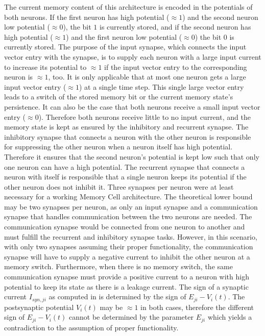 \documentclass[draft,final]{vutinfth} %
\begin{document}
    The current memory content of this architecture is encoded in the potentials of both neurons.
    If the first neuron has high potential ($\approx 1$) and the second neuron low potential ($\approx 0$), the bit $1$ is currently stored, and if the second neuron has high potential ($\approx 1$) and the first neuron low potential ($\approx 0$) the bit $0$ is currently stored.
    The purpose of the input synapse, which connects the input vector entry with the synapse, is to supply each neuron with a large input current to increase its potential to $\approx 1$ if the input vector entry to the corresponding neuron is $\approx 1$, too.
    It is only applicable that at most one neuron gets a large input vector entry ($\approx 1$) at a single time step.
    This single large vector entry leads to a switch of the stored memory bit or the current memory state's persistence.
    It can also be the case that both neurons receive a small input vector entry ($\approx 0$). Therefore both neurons receive little to no input current, and the memory state is kept as ensured by the inhibitory and recurrent synapse.
    The inhibitory synapse that connects a neuron with the other neuron is responsible for suppressing the other neuron when a neuron itself has high potential. Therefore it ensures that the second neuron's potential is kept low such that only one neuron can have a high potential.
    The recurrent synapse that connects a neuron with itself is responsible that a single neuron keeps its potential if the other neuron does not inhibit it.
    Three synapses per neuron were at least necessary for a working Memory Cell architecture.
    The theoretical lower bound may be two synapses per neuron, as only an input synapse and a communication synapse that handles communication between the two neurons are needed.
    The communication synapse would be connected from one neuron to another and must fulfill the recurrent and inhibitory synapse tasks.
    However, in this scenario, with only two synapses assuming their proper functionality, the communication synapse will have to supply a negative current to inhibit the other neuron at a memory switch.
    Furthermore, when there is no memory switch, the same communication synapse must provide a positive current to a neuron with high potential to keep its state as there is a leakage current.
    The sign of a synaptic current $I_{syn,ji}$ as computed in  is determined by the sign of $E_{ji} - V_i(t)$.
    The postsynaptic potential $V_i(t)$ may be $\approx 1$ in both cases, therefore the different sign of $E_{ji} - V_i(t)$ cannot be determined by the parameter $E_{ji}$ which yields a contradiction to the assumption of proper functionality.
\end{document}
